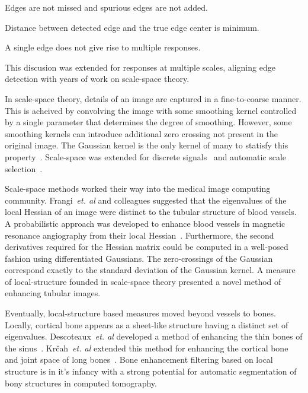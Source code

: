 \documentclass{InsightArticle}
\begin{document}
\begin{description}[style=multiline,labelindent=1cm,leftmargin=5cm]
  \item[Good Detection] Edges are not missed and spurious edges are not added.
  \item[Good Localization] Distance between detected edge and the true edge center is minimum.
  \item[One Response] A single edge does not give rise to multiple responses.
\end{description}

This discusion was extended for responses at multiple scales, aligning edge detection with years of work on scale-space theory.

In scale-space theory, details of an image are captured in a fine-to-coarse manner.
This is acheived by convolving the image with some smoothing kernel controlled by a single parameter that determines the degree of smoothing.
However, some smoothing kernels can introduce additional zero crossing not present in the original image.
The Gaussian kernel is the only kernel of many to statisfy this property~\cite{Babaud86}.
Scale-space was extended for discrete signals~\cite{lindeberg1990scale} and automatic scale selection~\cite{lindeberg1998feature}.

Scale-space methods worked their way into the medical image computing community.
Frangi~\emph{et. al} and colleagues suggested that the eigenvalues of the local Hessian of an image were distinct to the tubular structure of blood vessels.
A probabilistic approach was developed to enhance blood vessels in magnetic resonance angiography from their local Hessian~\cite{frangi1998multiscale}.
Furthermore, the second derivatives required for the Hessian matrix could be computed in a well-posed fashion using differentiated Gaussians.
The zero-crossings of the Gaussian correspond exactly to the standard deviation of the Gaussian kernel.
A measure of local-structure founded in scale-space theory presented a novel method of enhancing tubular images.

Eventually, local-structure based measures moved beyond vessels to bones.
Locally, cortical bone appears as a sheet-like structure having a distinct set of eigenvalues.
Descoteaux~\emph{et. al} developed a method of enhancing the thin bones of the sinus~\cite{descoteaux2006bone}.
Kr{\v{c}}ah~\emph{et. al} extended this method for enhancing the cortical bone and joint space of long bones~\cite{krvcah2011fully}.
Bone enhancement filtering based on local structure is in it's infancy with a strong potential for automatic segmentation of bony structures in computed tomography.
\end{document}
